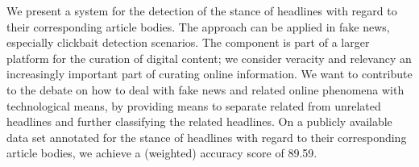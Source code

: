 We present a system for the detection of the stance of headlines with regard to their corresponding article bodies. The approach can be applied in fake news, especially clickbait detection scenarios. The component is part of a larger platform for the curation of digital content; we consider veracity and relevancy an increasingly important part of curating online information. We want to contribute to the debate on how to deal with fake news and related online phenomena with technological means, by providing means to separate related from unrelated headlines and further classifying the related headlines. On a publicly available data set annotated for the stance of headlines with regard to their corresponding article bodies, we achieve a (weighted) accuracy score of 89.59.

